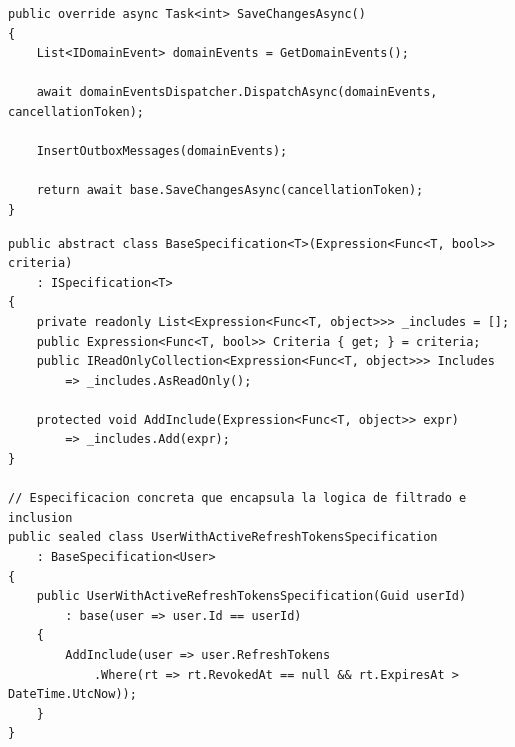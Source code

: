 \begin{lstlisting}[float=htbp, style=CSharp, caption={Sobrescritura de SaveChangesAsync para persistir eventos de dominio.}, label={lst:savechanges}]
public override async Task<int> SaveChangesAsync()
{
    List<IDomainEvent> domainEvents = GetDomainEvents();

    await domainEventsDispatcher.DispatchAsync(domainEvents, cancellationToken);

    InsertOutboxMessages(domainEvents);

    return await base.SaveChangesAsync(cancellationToken);
}
\end{lstlisting}

\begin{lstlisting}[float=htbp, style=CSharp, caption={Implementación del patrón Specification para la capa de persistencia de datos.}, label={lst:specification_pattern}]
public abstract class BaseSpecification<T>(Expression<Func<T, bool>> criteria) 
    : ISpecification<T>
{
    private readonly List<Expression<Func<T, object>>> _includes = [];
    public Expression<Func<T, bool>> Criteria { get; } = criteria;
    public IReadOnlyCollection<Expression<Func<T, object>>> Includes 
        => _includes.AsReadOnly();
        
    protected void AddInclude(Expression<Func<T, object>> expr) 
        => _includes.Add(expr);
}

// Especificacion concreta que encapsula la logica de filtrado e inclusion
public sealed class UserWithActiveRefreshTokensSpecification 
    : BaseSpecification<User>
{
    public UserWithActiveRefreshTokensSpecification(Guid userId)
        : base(user => user.Id == userId)
    {
        AddInclude(user => user.RefreshTokens
            .Where(rt => rt.RevokedAt == null && rt.ExpiresAt > DateTime.UtcNow));
    }
}
\end{lstlisting}

